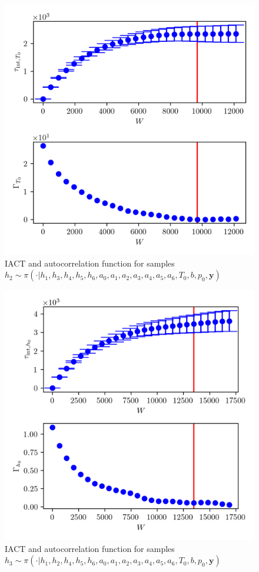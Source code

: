 \begin{figure}[ht!]
	\centering
	\includegraphics{UwerrTauIntTWalk1.png}
	\caption[IACT and autocorrelation function for $h_2$ samples.]{IACT and autocorrelation function for samples $h_2 \sim \pi( \cdot | h_1,h_3,h_4,h_5,h_6,a_0,a_1,a_2,a_3,a_4,a_5,a_6,T_0,b,p_0, \bm{y})$}
	\label{fig:}
\end{figure}


\begin{figure}[ht!]
	\centering
	\includegraphics{UwerrTauIntTWalk2.png}
	\caption[IACT and autocorrelation function for $h_3$ samples.]{IACT and autocorrelation function for samples $h_3 \sim \pi( \cdot | h_1,h_2,h_4,h_5,h_6,a_0,a_1,a_2,a_3,a_4,a_5,a_6,T_0,b,p_0, \bm{y})$}
	\label{fig:}
\end{figure}


